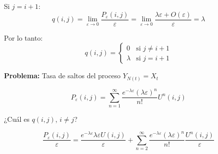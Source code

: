 \documentclass[12pt,a4paper]{article}
\begin{document}
Si $j = i+1$:
\begin{equation*}
q(i,j) = \lim_{\varepsilon \to 0} \frac{P_\varepsilon(i,j)}{\varepsilon} = \lim_{\varepsilon \to 0} \frac{\lambda\varepsilon + O(\varepsilon)}{\varepsilon} = \lambda
\end{equation*}

Por lo tanto:
\begin{equation*}
q(i,j) = \begin{cases}
0 & \text{si } j \neq i+1 \\
\lambda & \text{si } j = i+1
\end{cases}
\end{equation*}

\textbf{Problema:} Tasa de saltos del proceso $Y_{N(t)} = X_t$

\begin{equation*}
P_\varepsilon(i,j) = \sum_{n=1}^{\infty} \frac{e^{-\lambda\varepsilon}(\lambda\varepsilon)^n}{n!} U^n(i,j)
\end{equation*}

¿Cuál es $q(i,j)$, $i \neq j$?

\begin{equation*}
\frac{P_\varepsilon(i,j)}{\varepsilon} = \frac{e^{-\lambda\varepsilon} \lambda\varepsilon U(i,j)}{\varepsilon} + \sum_{n=2}^{\infty} \frac{e^{-\lambda\varepsilon}(\lambda\varepsilon)^n}{n!} \frac{U^n(i,j)}{\varepsilon}
\end{equation*}
\end{document}

